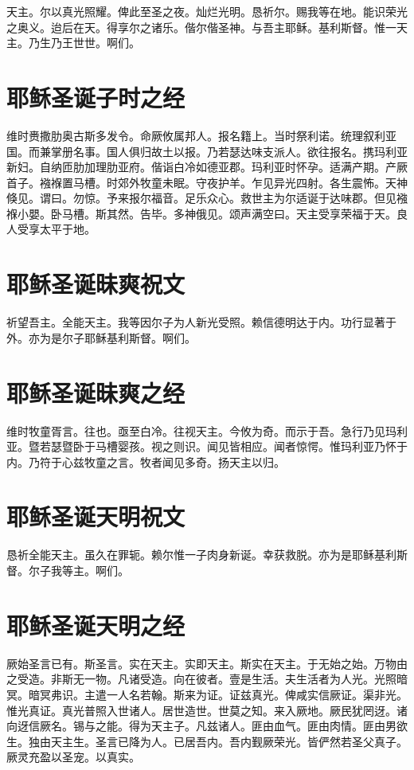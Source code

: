 \documentclass[UTF8,17pt]{ctexart}
\begin{document}
天主。尔以真光照耀。俾此⾄圣之夜。灿烂光明。恳祈尔。赐我等在地。能识荣光之奥义。迨后在天。得享尔之诸乐。偕尔偕圣神。与吾主耶稣。基利斯督。惟⼀天主。乃⽣乃王世世。啊们。

\section{耶稣圣诞⼦时之经}

维时赉撒肋奥古斯多发令。命厥攸属邦⼈。报名籍上。当时祭利诺。统理叙利亚国。⽽兼掌册名事。国⼈俱归故⼟以报。乃若瑟达味⽀派⼈。欲往报名。携玛利亚新妇。⾃纳匝肋加理肋亚府。偕诣⽩冷如德亚郡。玛利亚时怀孕。适满产期。产厥⾸⼦。襁褓置马槽。时郊外牧童未眠。守夜护⽺。乍见异光四射。各⽣震怖。天神倏见。谓⽈。勿惊。予来报尔福⾳。⾜乐众⼼。救世主为尔适诞于达味郡。但见襁褓⼩嬰。卧马槽。斯其然。告毕。多神俄见。颂声满空曰。天主受享荣福于天。良⼈受享太平于地。

\section{耶稣圣诞昧爽祝⽂}

祈望吾主。全能天主。我等因尔⼦为⼈新光受照。赖信德明达于内。功⾏显著于外。亦为是尔⼦耶稣基利斯督。啊们。

\section{耶稣圣诞昧爽之经}

维时牧童胥⾔。往也。亟⾄⽩冷。往视天主。今攸为奇。⽽⽰于吾。急⾏乃见玛利亚。暨若瑟暨卧于马槽婴孩。视之则识。闻见皆相应。闻者惊愕。惟玛利亚乃怀于内。乃符于⼼兹牧童之⾔。牧者闻见多奇。扬天主以归。

\section{耶稣圣诞天明祝⽂}

恳祈全能天主。虽久在罪轭。赖尔惟⼀⼦⾁⾝新诞。幸获救脱。亦为是耶稣基利斯督。尔⼦我等主。啊们。

\section{耶稣圣诞天明之经}

厥始圣⾔已有。斯圣⾔。实在天主。实即天主。斯实在天主。于⽆始之始。万物由之受造。⾮斯⽆⼀物。凡诸受造。向在彼者。壹是⽣活。夫⽣活者为⼈光。光照暗冥。暗冥弗识。主遣⼀⼈名若翰。斯来为证。证兹真光。俾咸实信厥证。渠⾮光。惟光真证。真光普照⼊世诸⼈。居世造世。世莫之知。来⼊厥地。厥民犹罔迓。诸向迓信厥名。锡与之能。得为天主⼦。凡兹诸⼈。匪由⾎⽓。匪由⾁情。匪由男欲⽣。独由天主⽣。圣⾔已降为⼈。已居吾内。吾内觐厥荣光。皆俨然若圣⽗真⼦。厥灵充盈以圣宠。以真实。
\end{document}

